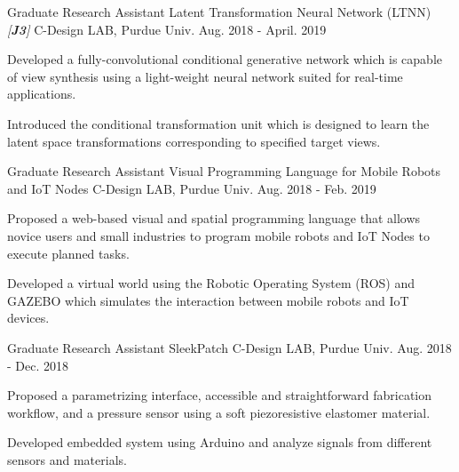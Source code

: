 \begin{cventries}

\cventry
{Graduate Research Assistant} %
{Latent Transformation Neural Network (LTNN) \textit{[\textbf{J3}]}} %
{C-Design LAB, Purdue Univ.} %
{Aug. 2018 - April. 2019} %
{ %
\begin{cvitems}
\item {Developed a fully-convolutional conditional generative network which is capable of view synthesis using a light-weight neural network suited for real-time applications.}
\item {Introduced the conditional transformation unit which is designed to learn the latent space transformations corresponding to specified target views.}
\end{cvitems}
}


\cventry
{Graduate Research Assistant} %
{Visual Programming Language for Mobile Robots and IoT Nodes} %
{C-Design LAB, Purdue Univ.} %
{Aug. 2018 - Feb. 2019} %
{ %
\begin{cvitems}
\item {Proposed a web-based visual and spatial programming language that allows novice users and small industries to program mobile robots and IoT Nodes to execute planned tasks.}
\item {Developed a virtual world using the Robotic Operating System (ROS) and GAZEBO which simulates the interaction between mobile robots and IoT devices.}
\end{cvitems} 
}


\cventry
{Graduate Research Assistant} %
{SleekPatch} %
{C-Design LAB, Purdue Univ.} %
{Aug. 2018 - Dec. 2018} %
{ %
\begin{cvitems}
\item {Proposed a parametrizing interface, accessible and straightforward fabrication workflow, and a pressure sensor using a soft piezoresistive elastomer material.}
\item {Developed embedded system using Arduino and analyze signals from different sensors and materials.}
\end{cvitems}
}


\end{cventries}
